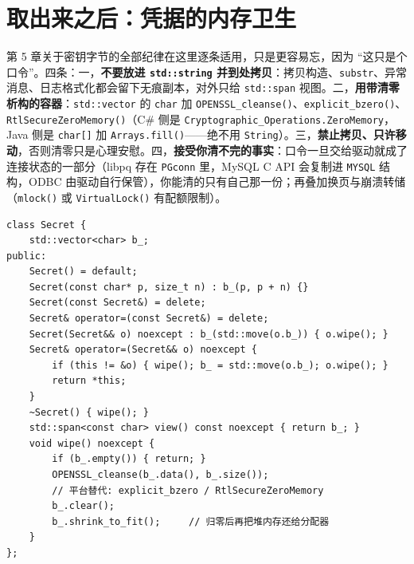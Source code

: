\documentclass[12pt,a4paper,fontset=fandol]{ctexbook}
\newcommand{\Fn}[1]{\texttt{#1()}}
\newcommand{\Tp}[1]{\texttt{#1}}
\newcommand{\CSharp}{C\#}
\begin{document}
\section{取出来之后：凭据的内存卫生}

第 5 章关于密钥字节的全部纪律在这里逐条适用，只是更容易忘，因为 ``这只是个口令''。四条：一，\textbf{不要放进 \Tp{std::string} 并到处拷贝}：拷贝构造、\Tp{substr}、异常消息、日志格式化都会留下无痕副本，对外只给 \Tp{std::span} 视图。二，\textbf{用带清零析构的容器}：\Tp{std::vector} 的 \Tp{char} 加 \Fn{OPENSSL\_cleanse}、\Fn{explicit\_bzero}、\Fn{RtlSecureZeroMemory}（\CSharp{} 侧是 \Tp{Cryptographic\_\allowbreak Operations.\allowbreak ZeroMemory}，Java 侧是 \Tp{char[]} 加 \Fn{Arrays.fill}——绝不用 \Tp{String}）。三，\textbf{禁止拷贝、只许移动}，否则清零只是心理安慰。四，\textbf{接受你清不完的事实}：口令一旦交给驱动就成了连接状态的一部分（libpq 存在 \Tp{PGconn} 里，MySQL C API 会复制进 \Tp{MYSQL} 结构，ODBC 由驱动自行保管），你能清的只有自己那一份；再叠加换页与崩溃转储（\Fn{mlock} 或 \Fn{VirtualLock} 有配额限制）。

\begin{lstlisting}[caption={C++：一个会清零、不可拷贝的凭据持有者}]
class Secret {
    std::vector<char> b_;
public:
    Secret() = default;
    Secret(const char* p, size_t n) : b_(p, p + n) {}
    Secret(const Secret&) = delete;
    Secret& operator=(const Secret&) = delete;
    Secret(Secret&& o) noexcept : b_(std::move(o.b_)) { o.wipe(); }
    Secret& operator=(Secret&& o) noexcept {
        if (this != &o) { wipe(); b_ = std::move(o.b_); o.wipe(); }
        return *this;
    }
    ~Secret() { wipe(); }
    std::span<const char> view() const noexcept { return b_; }
    void wipe() noexcept {
        if (b_.empty()) { return; }
        OPENSSL_cleanse(b_.data(), b_.size());
        // 平台替代: explicit_bzero / RtlSecureZeroMemory
        b_.clear();
        b_.shrink_to_fit();     // 归零后再把堆内存还给分配器
    }
};
\end{lstlisting}
\end{document}

